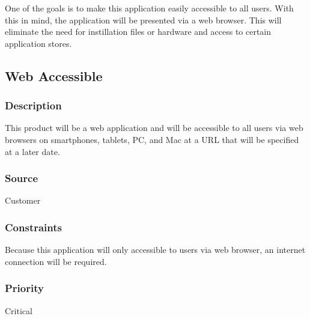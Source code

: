 One of the goals is to make this application easily accessible to all users. With this in mind, the application will be presented via a web browser. This will eliminate the need for instillation files or hardware and access to certain application stores.

\subsection{Web Accessible}
\subsubsection{Description}
This product will be a web application and will be accessible to all users via web browsers on smartphones, tablets, PC, and Mac at a URL that will be specified at a later date.
\subsubsection{Source}
Customer
\subsubsection{Constraints}
Because this application will only accessible to users via web browser, an internet connection will be required.
\subsubsection{Priority}
Critical